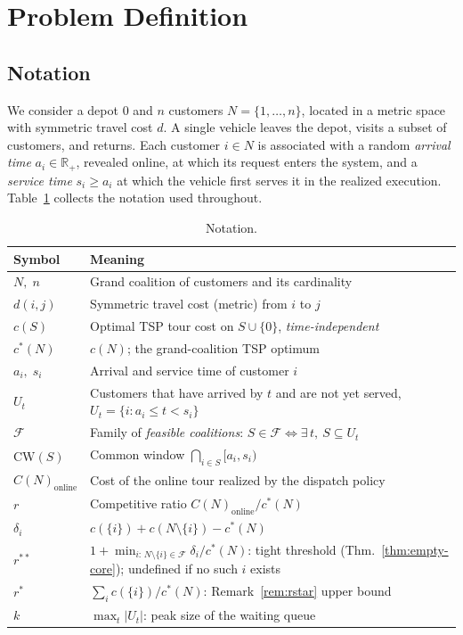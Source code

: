 \documentclass[11pt]{article}
\theoremstyle{plain}
\theoremstyle{definition}
\theoremstyle{remark}
\newcommand{\F}{\mathcal{F}}
\newcommand{\CW}{\mathrm{CW}}
\newcommand{\cstar}{c^{\ast}}
\begin{document}
\section{Problem Definition}
\label{sec:problem}

\subsection{Notation}
We consider a depot $0$ and $n$ customers $N = \{1,\ldots,n\}$, located in a metric space with symmetric travel cost $d$. A single vehicle leaves the depot, visits a subset of customers, and returns. Each customer $i\in N$ is associated with a random \emph{arrival time} $a_i \in \mathbb{R}_+$, revealed online, at which its request enters the system, and a \emph{service time} $s_i \ge a_i$ at which the vehicle first serves it in the realized execution. Table~\ref{tab:notation} collects the notation used throughout.

\begin{table}[t]
\centering
\caption{Notation.}
\label{tab:notation}
\small
\begin{tabular}{@{}ll@{}}
\toprule
Symbol & Meaning \\
\midrule
$N,\; n$ & Grand coalition of customers and its cardinality \\
$d(i,j)$ & Symmetric travel cost (metric) from $i$ to $j$ \\
$c(S)$ & Optimal TSP tour cost on $S\cup\{0\}$, \emph{time-independent} \\
$\cstar(N)$ & $c(N)$; the grand-coalition TSP optimum \\
$a_i,\; s_i$ & Arrival and service time of customer $i$ \\
$U_t$ & Customers that have arrived by $t$ and are not yet served, $U_t=\{i:a_i\le t< s_i\}$ \\
$\F$ & Family of \emph{feasible coalitions}: $S\in\F \iff \exists\, t,\ S\subseteq U_t$ \\
$\CW(S)$ & Common window $\bigcap_{i\in S}[a_i, s_i)$ \\
$C(N)_{\text{online}}$ & Cost of the online tour realized by the dispatch policy \\
$r$ & Competitive ratio $C(N)_{\text{online}}/\cstar(N)$ \\
$\delta_i$ & $c(\{i\})+c(N\setminus\{i\})-\cstar(N)$ \\
$r^{\ast\ast}$ & $1+\min_{i:\,N\setminus\{i\}\in\F}\delta_i/\cstar(N)$: tight threshold (Thm.~\ref{thm:empty-core}); undefined if no such $i$ exists \\
$r^{\ast}$ & $\sum_i c(\{i\})/\cstar(N)$: Remark~\ref{rem:rstar} upper bound \\
$k$ & $\max_t |U_t|$: peak size of the waiting queue \\
\bottomrule
\end{tabular}
\end{table}
\end{document}
